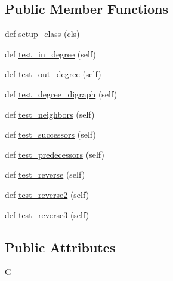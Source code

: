\subsection*{Public Member Functions}
\begin{DoxyCompactItemize}
\item 
def \hyperlink{classnetworkx_1_1classes_1_1tests_1_1test__digraph__historical_1_1TestDiGraphHistorical_ad526e44f71d72c2d8399344086ac8031}{setup\+\_\+class} (cls)
\item 
def \hyperlink{classnetworkx_1_1classes_1_1tests_1_1test__digraph__historical_1_1TestDiGraphHistorical_a2dba3398cc8b4142cdb5e6ca9f3865fe}{test\+\_\+in\+\_\+degree} (self)
\item 
def \hyperlink{classnetworkx_1_1classes_1_1tests_1_1test__digraph__historical_1_1TestDiGraphHistorical_a85d7e18518657f282e90aa11fa8bbfa1}{test\+\_\+out\+\_\+degree} (self)
\item 
def \hyperlink{classnetworkx_1_1classes_1_1tests_1_1test__digraph__historical_1_1TestDiGraphHistorical_a7c4ece62c8bd2f45399299f12fd02dcf}{test\+\_\+degree\+\_\+digraph} (self)
\item 
def \hyperlink{classnetworkx_1_1classes_1_1tests_1_1test__digraph__historical_1_1TestDiGraphHistorical_a4cadb57bfcdab97cb3b37cbcb9e2a3f9}{test\+\_\+neighbors} (self)
\item 
def \hyperlink{classnetworkx_1_1classes_1_1tests_1_1test__digraph__historical_1_1TestDiGraphHistorical_acf82fb66df9574e0bfe481fdbb6cfba2}{test\+\_\+successors} (self)
\item 
def \hyperlink{classnetworkx_1_1classes_1_1tests_1_1test__digraph__historical_1_1TestDiGraphHistorical_ab5219e3695fbc84bc11c04e46efc3d4f}{test\+\_\+predecessors} (self)
\item 
def \hyperlink{classnetworkx_1_1classes_1_1tests_1_1test__digraph__historical_1_1TestDiGraphHistorical_a4b44c50a8adab912402bc3f1cc087dea}{test\+\_\+reverse} (self)
\item 
def \hyperlink{classnetworkx_1_1classes_1_1tests_1_1test__digraph__historical_1_1TestDiGraphHistorical_a87fd94d58e07a0fb584910b99b2d5fe0}{test\+\_\+reverse2} (self)
\item 
def \hyperlink{classnetworkx_1_1classes_1_1tests_1_1test__digraph__historical_1_1TestDiGraphHistorical_a493219aee632aa8d93baebd6cfac0a82}{test\+\_\+reverse3} (self)
\end{DoxyCompactItemize}
\subsection*{Public Attributes}
\begin{DoxyCompactItemize}
\item 
\hyperlink{classnetworkx_1_1classes_1_1tests_1_1test__digraph__historical_1_1TestDiGraphHistorical_ae8db5d35ffcf3981feb7f1e3ce14e9d5}{G}
\end{DoxyCompactItemize}


